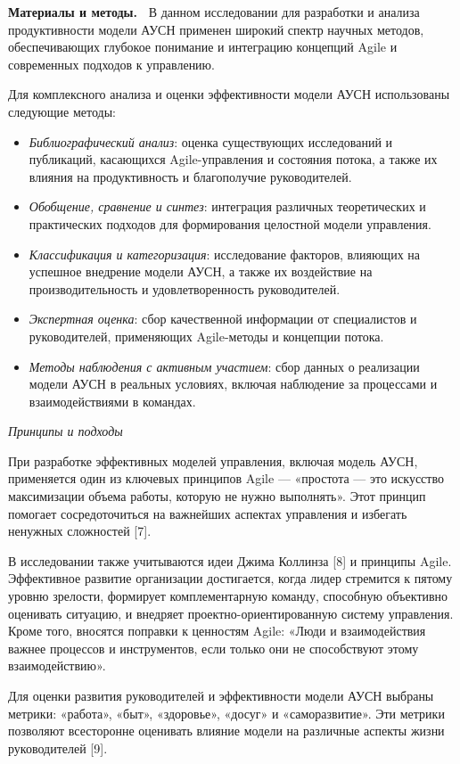\begin{multicols}{2}
{\bfseries Материалы и методы.~} В данном исследовании для разработки и
анализа продуктивности модели АУСН применен широкий спектр научных
методов, обеспечивающих глубокое понимание и интеграцию концепций Agile
и современных подходов к управлению.

Для комплексного анализа и оценки эффективности модели АУСН использованы
следующие методы:

\begin{itemize}
\item
  \emph{Библиографический анализ}: оценка существующих исследований и
  публикаций, касающихся Agile-управления и состояния потока, а также их
  влияния на продуктивность и благополучие руководителей.
\item
  \emph{Обобщение, сравнение и синтез}: интеграция различных
  теоретических и практических подходов для формирования целостной
  модели управления.
\item
  \emph{Классификация и категоризация}: исследование факторов, влияющих
  на успешное внедрение модели АУСН, а также их воздействие на
  производительность и удовлетворенность руководителей.
\item
  \emph{Экспертная оценка}: сбор качественной информации от специалистов
  и руководителей, применяющих Agile-методы и концепции потока.
\item
  \emph{Методы наблюдения с активным участием}: сбор данных о реализации
  модели АУСН в реальных условиях, включая наблюдение за процессами и
  взаимодействиями в командах.
\end{itemize}

\emph{Принципы и подходы}

При разработке эффективных моделей управления, включая модель АУСН,
применяется один из ключевых принципов Agile --- «простота --- это
искусство максимизации объема работы, которую не нужно выполнять». Этот
принцип помогает сосредоточиться на важнейших аспектах управления и
избегать ненужных сложностей {[}7{]}.

В исследовании также учитываются идеи Джима Коллинза {[}8{]} и принципы
Agile. Эффективное развитие организации достигается, когда лидер
стремится к пятому уровню зрелости, формирует комплементарную команду,
способную объективно оценивать ситуацию, и внедряет
проектно-ориентированную систему управления. Кроме того, вносятся
поправки к ценностям Agile: «Люди и взаимодействия важнее процессов и
инструментов, если только они не способствуют этому взаимодействию».

Для оценки развития руководителей и эффективности модели АУСН выбраны
метрики: «работа», «быт», «здоровье», «досуг» и «саморазвитие». Эти
метрики позволяют всесторонне оценивать влияние модели на различные
аспекты жизни руководителей {[}9{]}.


\end{multicols}
